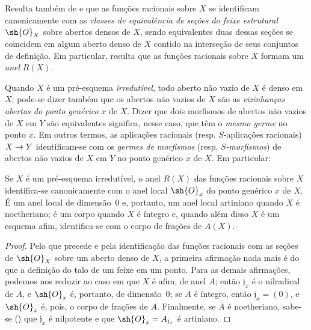 \documentclass[oneside]{amsart}
\makeatletter
\newcommand{\ega@arrow}[2]{\mathchoice{#1}{#2}{#2}{#2}}
\renewcommand{\to}{\ega@arrow{\longrightarrow}{\rightarrow}}
\let\EGAOriginalLabel\label
\renewcommand{\label}[1]{\phantomsection\EGAOriginalLabel{#1}}
\makeatother
\begin{document}
\begin{env}[7.1.3]
\label{I.7.1.3}
Resulta também de  e  que as funções racionais sobre $X$ se identificam canonicamente com as \emph{classes de equivalência de seções do feixe estrutural $\sh{O}_X$} sobre abertos densos de $X$, sendo equivalentes duas dessas seções se coincidem em algum aberto denso de $X$ contido na interseção de seus conjuntos de definição.
Em particular, resulta que as funções racionais sobre $X$ formam um \emph{anel} $R(X)$.
\end{env}

\begin{env}[7.1.4]
\label{I.7.1.4}
Quando $X$ é um pré-esquema \emph{irredutível}, todo aberto não vazio de $X$ é denso em $X$; pode-se dizer também que os abertos não vazios de $X$ são as \emph{vizinhanças abertas do ponto genérico} $x$ de $X$.
Dizer que dois morfismos de abertos não vazios de $X$ em $Y$ são equivalentes significa, nesse caso, que têm o \emph{mesmo germe} no ponto $x$.
Em outros termos, as aplicações racionais (resp. $S$-aplicações racionais) $X\to Y$ identificam-se com os \emph{germes de morfismos} (resp. \emph{$S$-morfismos}) de abertos não vazios de $X$ em $Y$ no ponto genérico $x$ de $X$.
Em particular:
\end{env}

\begin{proposition}[7.1.5]
\label{I.7.1.5}
Se $X$ é um pré-esquema irredutível, o anel $R(X)$ das funções racionais sobre $X$ identifica-se canonicamente com o anel local $\sh{O}_x$ do ponto genérico $x$ de $X$.
É um anel local de dimensão~0 e, portanto, um anel local artiniano quando $X$ é noetheriano; é um corpo quando $X$ é íntegro e, quando além disso $X$ é um esquema afim, identifica-se com o corpo de frações de $A(X)$.
\end{proposition}

\begin{proof}
Pelo que precede e pela identificação das funções racionais com as seções de $\sh{O}_X$ sobre um aberto denso de $X$, a primeira afirmação nada mais é do que a definição do talo de um feixe em um ponto.
Para as demais afirmações, podemos nos reduzir ao caso em que $X$ é afim, de anel $A$; então $\mathfrak{j}_x$ é o nilradical de $A$, e $\sh{O}_x$ é, portanto, de dimensão~0; se $A$ é íntegro, então $\mathfrak{j}_x=(0)$, e $\sh{O}_x$ é, pois, o corpo de frações de $A$.
Finalmente, se $A$ é noetheriano, sabe-se (\cite[p.~127, cor.~4]{I-11}) que $\mathfrak{j}_x$ é nilpotente e que $\sh{O}_x=A_{\mathfrak{j}_x}$ é artiniano.
\end{proof}
\end{document}
